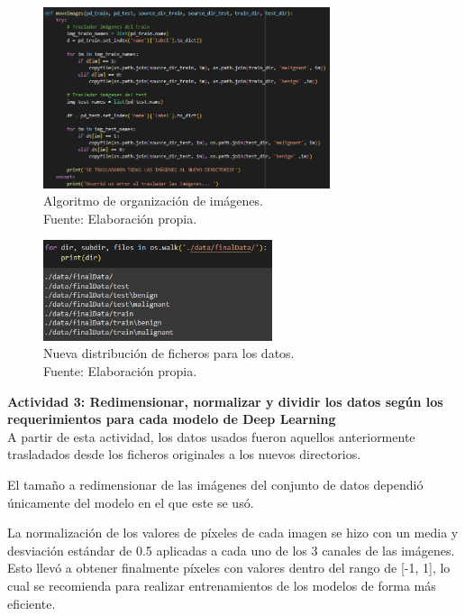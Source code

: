 \begin{figure}[H]
	\begin{center}
		\includegraphics[width=0.75\textwidth]{4/figures/algoritm_organi.PNG}
		\caption[Algoritmo de organización de imágenes]{Algoritmo de organización de imágenes. \\
		Fuente: Elaboración propia.}
		\label{4:fig108}
	\end{center}
\end{figure}

\begin{figure}[H]
	\begin{center}
		\includegraphics[width=0.60\textwidth]{4/figures/nuevos_ficheros.PNG}
		\caption[Nueva distribución de ficheros para los datos]{Nueva distribución de ficheros para los datos. \\
		Fuente: Elaboración propia.}
		\label{4:fig109}
	\end{center}
\end{figure}

\textbf{Actividad 3: Redimensionar, normalizar y dividir los datos según los requerimientos para cada modelo de Deep Learning}
\\
A partir de esta actividad, los datos usados fueron aquellos anteriormente trasladados desde los ficheros originales a los nuevos directorios.

El tamaño a redimensionar de las imágenes del conjunto de datos dependió únicamente del modelo en el que este se usó.

La normalización de los valores de píxeles de cada imagen se hizo con un media y desviación estándar de 0.5 aplicadas a cada uno de los 3 canales de las imágenes. Esto llevó a obtener finalmente píxeles con valores dentro del rango de [-1, 1], lo cual se recomienda para realizar entrenamientos de los modelos de forma más eficiente.

